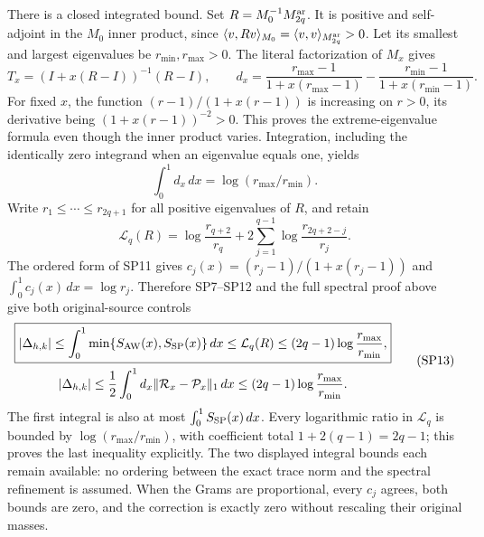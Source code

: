 There is a closed integrated bound. Set \(R=M_0^{-1}M^{\rm ar}_{2q}\).
It is positive and self-adjoint in the \(M_0\) inner product, since
\(\langle v,Rv\rangle_{M_0}=\langle v,v\rangle_{M^{\rm ar}_{2q}}>0\).
Let its smallest and largest eigenvalues be \(r_{\min},r_{\max}>0\).
The literal factorization of \(M_x\) gives
\[
 T_x=(I+x(R-I))^{-1}(R-I),\qquad
 d_x=\frac{r_{\max}-1}{1+x(r_{\max}-1)}
           -\frac{r_{\min}-1}{1+x(r_{\min}-1)} .
 \tag{SP11}
\]
For fixed \(x\), the function \((r-1)/(1+x(r-1))\) is increasing
on \(r>0\), its derivative being \((1+x(r-1))^{-2}>0\).
This proves the extreme-eigenvalue formula even though the inner
product varies. Integration, including the identically zero
integrand when an eigenvalue equals one, yields
\[
       \int_0^1d_x\,dx=\log(r_{\max}/r_{\min}).
 \tag{SP12}
\]
Write \(r_1\le\cdots\le r_{2q+1}\) for all positive eigenvalues
of \(R\), and retain
\[
 \mathcal L_q(R)=\log\frac{r_{q+2}}{r_q}
       +2\sum_{j=1}^{q-1}\log\frac{r_{2q+2-j}}{r_j}.
\]
The ordered form of SP11 gives
\(c_j(x)=(r_j-1)/(1+x(r_j-1))\) and
\(\int_0^1c_j(x)\,dx=\log r_j\). Therefore SP7--SP12 and the
full spectral proof above give both original-source controls
\[
 \begin{gathered}
 \boxed{|\Delta_{h,k}|
 \le\int_0^1\min\{S_{\rm AW}(x),S_{\rm SP}(x)\}\,dx
 \le\mathcal L_q(R)
 \le(2q-1)\log\frac{r_{\max}}{r_{\min}},}\\
 |\Delta_{h,k}|
 \le\frac12\int_0^1d_x\|\mathcal R_x-\mathcal P_x\|_1\,dx
 \le(2q-1)\log\frac{r_{\max}}{r_{\min}}.
 \end{gathered}
 \tag{SP13}
\]
The first integral is also at most \(\int_0^1S_{\rm SP}(x)\,dx\).
Every logarithmic ratio in \(\mathcal L_q\) is bounded by
\(\log(r_{\max}/r_{\min})\), with coefficient total
\(1+2(q-1)=2q-1\); this proves the last inequality explicitly.
The two displayed integral bounds each remain available: no
ordering between the exact trace norm and the spectral refinement
is assumed. When the Grams are proportional, every \(c_j\) agrees,
both bounds are zero, and the correction is exactly zero without
rescaling their original masses.



